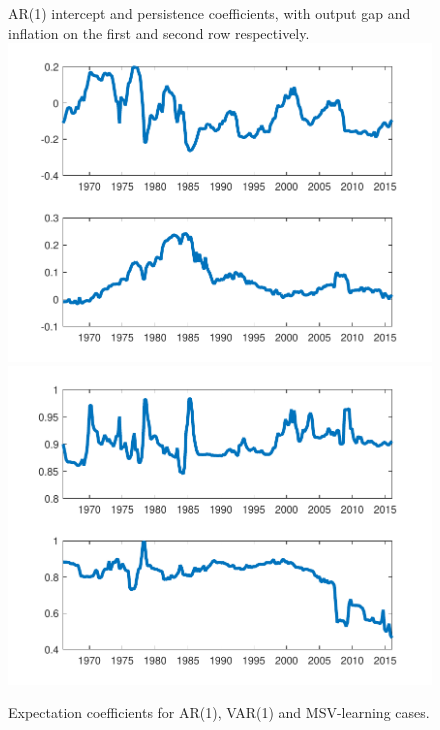 \documentclass[12pt,reqno]{article}
\numberwithin{equation}{section}
\begin{document}
\begin{figure}[H]


\caption{Expectation coefficients for AR(1), VAR(1) and MSV-learning cases.}
\label{nkpc_learning_coef}
\vspace{5 mm}
{AR(1) intercept and persistence coefficients, with output gap and inflation on the first and second row respectively.}\\
\includegraphics[scale=0.35]{NKPC_ree_init_AR1_alphas.pdf}
\includegraphics[scale=0.35]{NKPC_ree_init_AR1_betas.pdf}\\


\end{figure}
\end{document}
